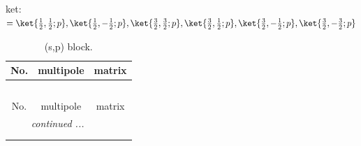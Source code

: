 \documentclass[fleqn,8pt,landscape]{jsarticle}
\begin{document}
\noindent
ket: $=\ket{\frac{1}{2},\frac{1}{2};p}, \ket{\frac{1}{2},- \frac{1}{2};p}, \ket{\frac{3}{2},\frac{3}{2};p}, \ket{\frac{3}{2},\frac{1}{2};p}, \ket{\frac{3}{2},- \frac{1}{2};p}, \ket{\frac{3}{2},- \frac{3}{2};p}$
\renewcommand{\arraystretch}{1.6}
\begin{longtable}{ccc}
\caption{(s,p) block.}
 \\
 \hline \hline
No. & multipole & matrix \\ \hline \endfirsthead

\multicolumn{2}{l}{\tablename\ \thetable{}} \\
 \hline \hline
No. & multipole & matrix \\ \hline \endhead

 \hline \hline
\multicolumn{2}{r}{\footnotesize\it continued ...} \\ \endfoot

 \hline \hline
\multicolumn{2}{r}{} \\ \endlastfoot


\end{longtable}
\end{document}
